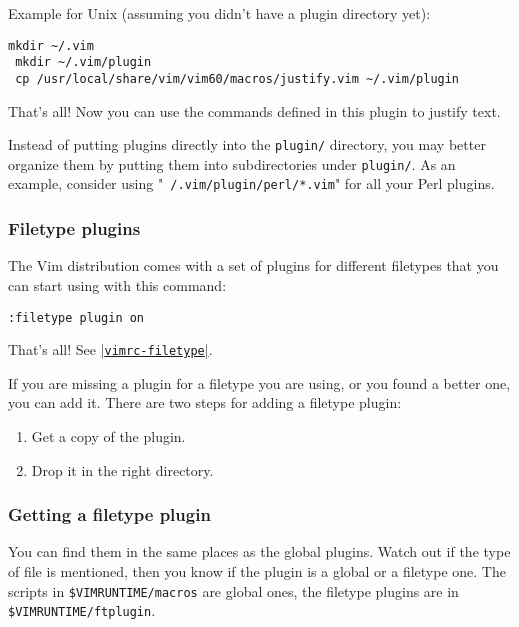 Example for Unix (assuming you didn't have a plugin directory yet):

 \begin{Verbatim}[samepage=true]
 mkdir ~/.vim
 mkdir ~/.vim/plugin
 cp /usr/local/share/vim/vim60/macros/justify.vim ~/.vim/plugin
 \end{Verbatim}

That's all!
Now you can use the commands defined in this plugin to justify text.

Instead of putting plugins directly into the \texttt{plugin/} directory, you may better organize them by putting them into subdirectories under \texttt{plugin/}.
As an example, consider using "\texttt{~/.vim/plugin/perl/*.vim}" for all your Perl plugins.

\subsubsection{Filetype plugins}
\label{add-filetype-plugin}
\label{ftplugin}

The Vim distribution comes with a set of plugins for different filetypes that you can start using with this command:

 \begin{Verbatim}[samepage=true]
 :filetype plugin on
 \end{Verbatim}

That's all!
See \hyperref[vimrc-filetype]{|\texttt{vimrc-filetype}|}.

If you are missing a plugin for a filetype you are using, or you found a better one, you can add it.
There are two steps for adding a filetype plugin:

\begin{enumerate}
				\item Get a copy of the plugin.
				\item Drop it in the right directory.
\end{enumerate}

\subsubsection{Getting a filetype plugin}

You can find them in the same places as the global plugins.
Watch out if the type of file is mentioned, then you know if the plugin is a global or a filetype one.
The scripts in \texttt{\$VIMRUNTIME/macros} are global ones, the filetype plugins are in \texttt{\$VIMRUNTIME/ftplugin}.

